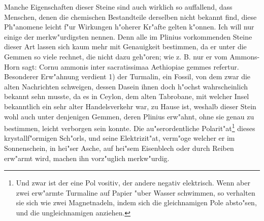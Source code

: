 \documentclass[a4paper, 11pt, oneside, polutonikogreek, german]{article}
\begin{document}
Manche Eigenschaften dieser Steine sind auch wirklich so auffallend, dass Menschen, denen die chemischen Bestandteile derselben nicht bekannt find, diese Ph"anomene leicht f"ur Wirkungen h"oherer Kr"afte gelten k"onnen. Ich will nur einige der merkw"urdigsten nennen. Denn alle im Plinius vorkommenden Steine dieser Art lassen sich kaum mehr mit Genauigkeit bestimmen, da er unter die Gemmen so viele rechnet, die nicht dazu geh"oren; wie z. B. nur er vom Ammons-Horn sagt: Cornu ammonis inter sacratissimaa Aethiopiae gemmes refertur. Besonderer Erw"ahnung verdient 1) der Turmalin, ein Fossil, von dem zwar die alten Nachrichten schweigen, dessen Dasein ihnen doch h"ochst wahrscheinlich bekannt sehn musste, da es in Ceylon, dem alten Tabrobane, mit welcher Insel bekanntlich ein sehr alter Handelsverkehr war, zu Hause ist, weshalb dieser Stein wohl auch unter denjenigen Gemmen, deren Plinius erw"ahnt, ohne sie genau zu bestimmen, leicht verborgen sein konnte. Die au"serordentliche Polarit"at\footnote{Und zwar ist der eine Pol vositiv, der andere negativ elektrisch. Wenn aber zwei erw"armte Turmaline auf Papier "uber Wasser schwimmen, so verhalten sie sich wie zwei Magnetnadeln, indem sich die gleichnamigen Pole absto"sen, und die ungleichnamigen anziehen.} dieses krystallf"ormigen Sch"orls, und seine Elektrizit"at, verm"oge welcher er im Sonnenschein, in hei"ser Asche, auf hei"sem Eisenblech oder durch Reiben erw"armt wird, machen ihn vorz"uglich merkw"urdig.
\end{document}

